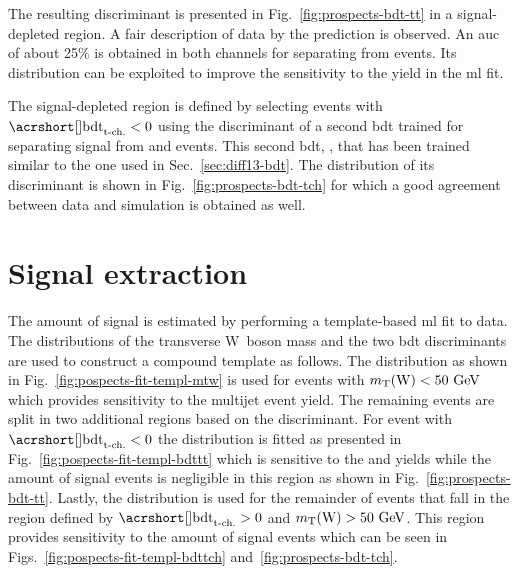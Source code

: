 The resulting \bdttt discriminant is presented in Fig.~\ref{fig:prospects-bdt-tt} in a signal-depleted region. A fair description of data by the prediction is observed. An \gls{auc} of about 25\% is obtained in both channels for separating \ttbar from \wjets events. Its distribution can be exploited to improve the sensitivity to the \wjets yield in the \gls{ml} fit.


The signal-depleted region is defined by selecting events with $\bdttch<0$ using the discriminant of a second \gls{bdt} trained for separating signal from \wjets and \ttbar events. This second \gls{bdt}, \bdttch, that has been trained similar to the one used in Sec.~\ref{sec:diff13-bdt}. The distribution of its discriminant is shown in Fig.~\ref{fig:prospects-bdt-tch} for which a good agreement between data and simulation is obtained as well.


\section{Signal extraction}
\label{sec:prospects-fit}

The amount of signal is estimated by performing a template-based \gls{ml} fit to data. The distributions of the transverse W~boson mass and the two \gls{bdt} discriminants are used to construct a compound template as follows. The \mtw distribution as shown in Fig.~\ref{fig:pospects-fit-templ-mtw} is used for events with $m_{\textrm{T}}(\textrm{W})<50~\textrm{GeV}$ which provides sensitivity to the multijet event yield. The remaining events are split in two additional regions based on the \bdttch discriminant. For event with $\bdttch<0$ the \bdttt distribution is fitted as presented in Fig.~\ref{fig:pospects-fit-templ-bdttt} which is sensitive to the \wjets and \ttbar yields while the amount of signal events is negligible in this region as shown in Fig.~\ref{fig:prospects-bdt-tt}. Lastly, the \bdttch distribution is used for the remainder of events that fall in the region defined by $\bdttch>0$ and $m_{\textrm{T}}(\textrm{W})>50~\textrm{GeV}$. This region provides sensitivity to the amount of signal events which can be seen in Figs.~\ref{fig:pospects-fit-templ-bdttch} and~\ref{fig:prospects-bdt-tch}.

